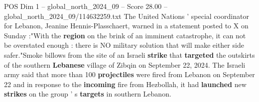 \begin{textsample}{POS Dim 1 – global\_north\_2024\_09 – Score 28.00 – global\_north\_2024\_09/114632259.txt}
The United Nations ' special coordinator for Lebanon, Jeanine Hennis-Plasschaert, warned in a statement posted to X on Sunday :"With the \textbf{region} on the brink of an imminent catastrophe, it can not be overstated enough : there is NO military solution that will make either side safer."Smoke billows from the site of an Israeli \textbf{strike} that \textbf{targeted} the outskirts of the southern \textbf{Lebanese} village of Zibqin on September 22, 2024.
The Israeli army said that more than 100 \textbf{projectiles} were fired from Lebanon on September 22 and in response to the \textbf{incoming} fire from Hezbollah, it had \textbf{launched} new \textbf{strikes} on the group ' s \textbf{targets} in southern Lebanon.

\end{textsample}
